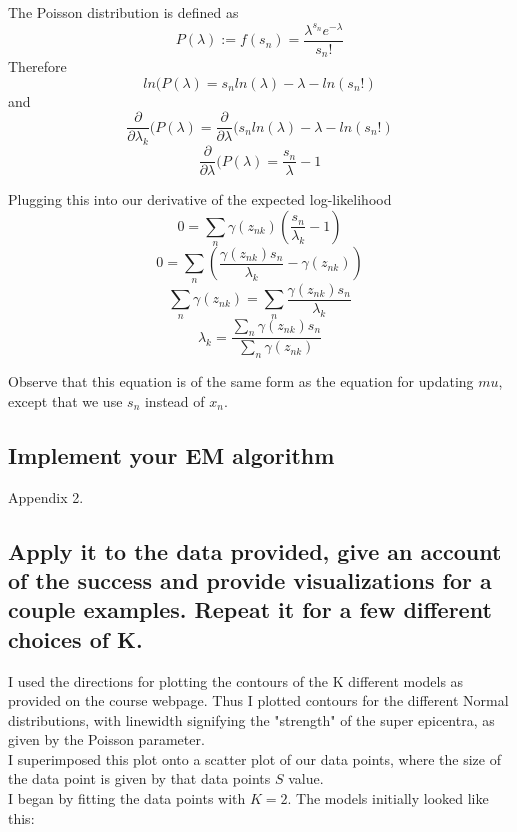 \documentclass[11pt,a4paper]{article}
\begin{document}
The Poisson distribution is defined as
$$ P(\lambda) := f(s_{n}) = \frac{\lambda^{s_{n}}e^{-\lambda}}{s_{n}!} $$
Therefore
$$ln(P(\lambda) = s_{n}ln(\lambda) - \lambda - ln(s_{n}!)$$
and
$$\frac{\partial}{\partial \lambda_{k}}(P(\lambda) = \frac{\partial}{\partial \lambda}(s_{n}ln(\lambda) - \lambda - ln(s_{n}!)$$
$$\frac{\partial}{\partial \lambda}(P(\lambda) = \frac{s_{n}}{\lambda} - 1$$

Plugging this into our derivative of the expected log-likelihood
$$ 0 = \sum_{n} \gamma(z_{nk})(\frac{s_{n}}{\lambda_{k}} - 1)$$
$$ 0 = \sum_{n} (\frac{\gamma(z_{nk})s_{n}}{\lambda_{k}} - \gamma(z_{nk}))$$
$$ \sum_{n}\gamma(z_{nk}) = \sum_{n} \frac{\gamma(z_{nk})s_{n}}{\lambda_{k}} $$
$$ \lambda_{k} =  \frac{\sum_{n}\gamma(z_{nk})s_{n}}{\sum_{n}\gamma(z_{nk})} $$

Observe that this equation is of the same form as the equation for updating $mu$, except that we use $s_{n}$ instead of $x_{n}$.

\subsection{Implement your EM algorithm}

Appendix 2.

\subsection{Apply it to the data provided, give an account of the success and provide visualizations for a couple examples. Repeat it for a few different choices of K.}

I used the directions for plotting the contours of the K different models as provided on the course webpage. Thus I plotted contours for the different Normal distributions, with linewidth signifying the "strength" of the super epicentra,  as given by the Poisson parameter.\\

I superimposed this plot onto a scatter plot of our data points, where the size of the data point is given by that data points $S$ value.\\

I began by fitting the data points with $K = 2$. The models initially looked like this:
\end{document}
